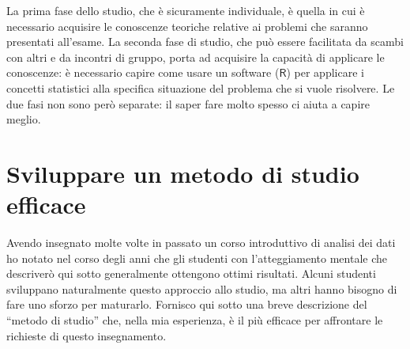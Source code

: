 \documentclass[
  11pt,
]{krantz}
\theoremstyle{definition}
\theoremstyle{definition}
\theoremstyle{definition}
\theoremstyle{definition}
\theoremstyle{remark}
\begin{document}
La prima fase dello studio, che è sicuramente individuale, è quella in cui è necessario acquisire le conoscenze teoriche relative ai problemi che saranno presentati all'esame. La seconda fase di studio, che può essere facilitata da scambi con altri e da incontri di gruppo, porta ad acquisire la capacità di applicare le conoscenze: è necessario capire come usare un software (\(\textsf{R}\)) per applicare i concetti statistici alla specifica situazione del problema che si vuole risolvere. Le due fasi non sono però separate: il saper fare molto spesso ci aiuta a capire meglio.

\hypertarget{sviluppare-un-metodo-di-studio-efficace}{%
\section*{Sviluppare un metodo di studio efficace}\label{sviluppare-un-metodo-di-studio-efficace}}


Avendo insegnato molte volte in passato un corso introduttivo di analisi dei dati ho notato nel corso degli anni che gli studenti con l'atteggiamento mentale che descriverò qui sotto generalmente ottengono ottimi risultati. Alcuni studenti sviluppano naturalmente questo approccio allo studio, ma altri hanno bisogno di fare uno sforzo per maturarlo. Fornisco qui sotto una breve descrizione del ``metodo di studio'' che, nella mia esperienza, è il più efficace per affrontare le richieste di questo insegnamento.
\end{document}
